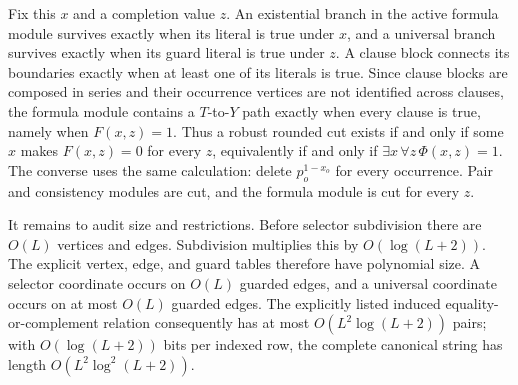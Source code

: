 Fix this \(x\) and a completion value \(z\).  An existential branch in the active formula module survives exactly when its literal is true under \(x\), and a universal branch survives exactly when its guard literal is true under \(z\).  A clause block connects its boundaries exactly when at least one of its literals is true.  Since clause blocks are composed in series and their occurrence vertices are not identified across clauses, the formula module contains a \(T\)-to-\(Y\) path exactly when every clause is true, namely when \(F(x,z)=1\).  Thus a robust rounded cut exists if and only if some \(x\) makes \(F(x,z)=0\) for every \(z\), equivalently if and only if \(\exists x\,\forall z\,\Phi(x,z)=1\).  The converse uses the same calculation: delete \(p_o^{1-x_o}\) for every occurrence.  Pair and consistency modules are cut, and the formula module is cut for every \(z\).

It remains to audit size and restrictions.  Before selector subdivision there are \(O(L)\) vertices and edges.  Subdivision multiplies this by \(O(\log(L+2))\).  The explicit vertex, edge, and guard tables therefore have polynomial size.  A selector coordinate occurs on \(O(L)\) guarded edges, and a universal coordinate occurs on at most \(O(L)\) guarded edges.  The explicitly listed induced equality-or-complement relation consequently has at most \(O(L^2\log(L+2))\) pairs; with \(O(\log(L+2))\) bits per indexed row, the complete canonical string has length \(O(L^2\log^2(L+2))\).

